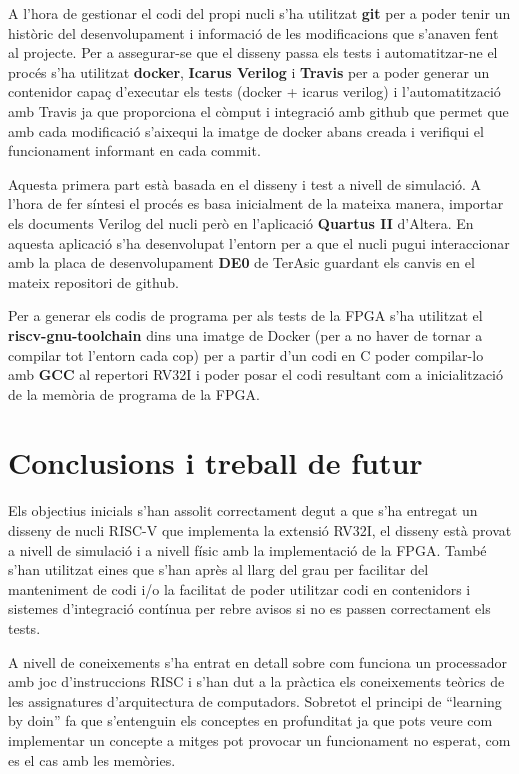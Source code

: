 \documentclass[10pt,a4paper,twocolumn,twoside]{article}
\begin{document}
A l'hora de gestionar el codi del propi nucli s'ha utilitzat \textbf{git} per a poder tenir un històric del desenvolupament i informació de les modificacions que s'anaven fent al projecte. Per a assegurar-se que el disseny passa els tests i automatitzar-ne el procés s'ha utilitzat \textbf{docker}, \textbf{Icarus Verilog} i \textbf{Travis} per a poder generar un contenidor capaç d'executar els tests (docker + icarus verilog) i l'automatització amb Travis ja que proporciona el còmput i integració amb github que permet que amb cada modificació s'aixequi la imatge de docker abans creada i verifiqui el funcionament informant en cada commit. 

Aquesta primera part està basada en el disseny i test a nivell de simulació. A l'hora de fer síntesi el procés es basa inicialment de la mateixa manera, importar els documents Verilog del nucli però en l'aplicació \textbf{Quartus II} d'Altera. En aquesta aplicació s'ha desenvolupat l'entorn per a que el nucli pugui interaccionar amb la placa de desenvolupament \textbf{DE0} de TerAsic guardant els canvis en el mateix repositori de github.

Per a generar els codis de programa per als tests de la FPGA s'ha utilitzat el \textbf{riscv-gnu-toolchain} dins una imatge de Docker (per a no haver de tornar a compilar tot l'entorn cada cop) per a partir d'un codi en C poder compilar-lo amb \textbf{GCC} al repertori RV32I i poder posar el codi resultant com a inicialització de la memòria de programa de la FPGA.

\section{Conclusions i treball de futur}  %

Els objectius inicials s'han assolit correctament degut a que s'ha entregat un disseny de nucli RISC-V que implementa la extensió RV32I, el disseny està provat a nivell de simulació i a nivell físic amb la implementació de la FPGA. També s'han utilitzat eines que s'han après al llarg del grau per facilitar del manteniment de codi i/o la facilitat de poder utilitzar codi en contenidors i sistemes d'integració contínua per rebre avisos si no es passen correctament els tests.

A nivell de coneixements s'ha entrat en detall sobre com funciona un processador amb joc d'instruccions RISC i s'han dut a la pràctica els coneixements teòrics de les assignatures d'arquitectura de computadors.
Sobretot el principi de ``learning by doin'' fa que s'entenguin els conceptes en profunditat ja que pots veure com implementar un concepte a mitges pot provocar un funcionament no esperat, com es el cas amb les memòries.
\end{document}
